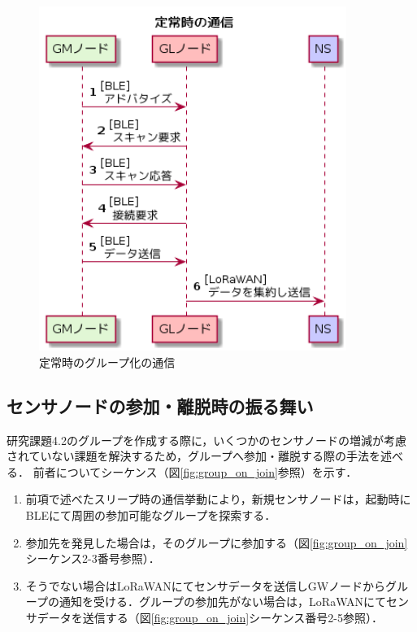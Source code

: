 \begin{figure}[]
    \begin{center}
    \includegraphics[width=10cm]{figures/v2.0/定常時の通信.png}
    \caption{定常時のグループ化の通信}
    \label{fig:default_data_flow}
    \end{center}
\end{figure}

\subsection{センサノードの参加・離脱時の振る舞い}
研究課題4.2のグループを作成する際に，いくつかのセンサノードの増減が考慮されていない課題を解決するため，グループへ参加・離脱する際の手法を述べる．
前者についてシーケンス（図\ref{fig:group_on_join}参照）を示す．

\begin{enumerate}
    \item 前項で述べたスリープ時の通信挙動により，新規センサノードは，起動時にBLEにて周囲の参加可能なグループを探索する．
    \item 参加先を発見した場合は，そのグループに参加する（図\ref{fig:group_on_join}シーケンス2-3番号参照）．
    \item そうでない場合はLoRaWANにてセンサデータを送信しGWノードからグループの通知を受ける．グループの参加先がない場合は，LoRaWANにてセンサデータを送信する（図\ref{fig:group_on_join}シーケンス番号2-5参照）．
\end{enumerate}

